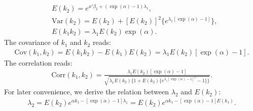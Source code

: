 \documentclass[submission, Phys]{SciPost}
\begin{document}
\begin{appendix}
\begin{align}
&E(k_2)=e^{x'\beta_2+(\exp(\alpha)-1)\lambda_1},\\
&\text{Var}(k_2)=E(k_2)+[E(k_2)]^2\{e^{\lambda_1[\exp(\alpha)-1]}\},\\&E(k_1k_2)=\lambda_1E(k_2)\exp(\alpha).
\end{align}
The covariance of $k_1$ and $k_2$ reads:
\begin{align}
\text{Cov}(k_1,k_2)=E(k_1k_2)-E(k_1)E(k_2)=\lambda_1E(k_2)[\exp(\alpha)-1].
\end{align}
The correlation reads:
\begin{align}
\text{Corr}(k_1,k_2) = \frac{\lambda_1E(k_2)[\exp(\alpha)-1]}{\sqrt{\lambda_1E(k_2)\{1+E(k_2)\{e^{\lambda_1[\exp(\alpha)-1]^2}-1\}\}}}.\label{Corr}
\end{align}
For later convenience, we derive the relation between $\lambda_2$ and $E(k_2)$:
\begin{align}
\lambda_2 = E(k_2)e^{\alpha k_1 - [\exp(\alpha)-1]\lambda_1}=E(k_2)e^{\alpha k_1 - [\exp(\alpha)-1]E(k_1)}.\label{relation}
\end{align}

\end{appendix}
\end{document}
